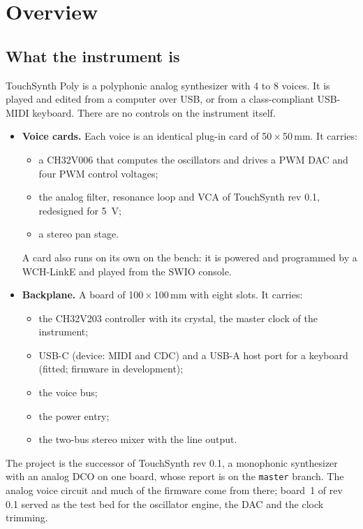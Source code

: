 \documentclass[11pt,a4paper]{article}
\begin{document}
\clearpage
\tableofcontents
\clearpage

\section{Overview}\label{sec:overview}

\subsection{What the instrument is}
TouchSynth Poly is a polyphonic analog synthesizer with 4 to 8 voices. It is played and edited from a computer
over USB, or from a class-compliant USB-MIDI keyboard. There are no controls on the instrument itself.
\begin{itemize}
  \item \textbf{Voice cards.} Each voice is an identical plug-in card of 50\,$\times$\,50\,mm. It carries:
    \begin{itemize}
      \item a CH32V006 that computes the oscillators and drives a PWM DAC and four PWM control voltages;
      \item the analog filter, resonance loop and VCA of TouchSynth rev 0.1, redesigned for \SI{5}{V};
      \item a stereo pan stage.
    \end{itemize}
    A card also runs on its own on the bench: it is powered and programmed by a WCH-LinkE and played from the
    SWIO console.
  \item \textbf{Backplane.} A board of 100\,$\times$\,100\,mm with eight slots. It carries:
    \begin{itemize}
      \item the CH32V203 controller with its crystal, the master clock of the instrument;
      \item USB-C (device: MIDI and CDC) and a USB-A host port for a keyboard (fitted; firmware in development);
      \item the voice bus;
      \item the power entry;
      \item the two-bus stereo mixer with the line output.
    \end{itemize}
\end{itemize}
The project is the successor of TouchSynth rev 0.1, a monophonic synthesizer with an analog DCO on one board, whose
report is on the \texttt{master} branch. The analog voice circuit and much of the firmware come from there; board~1 of
rev 0.1 served as the test bed for the oscillator engine, the DAC and the clock trimming.
\end{document}
